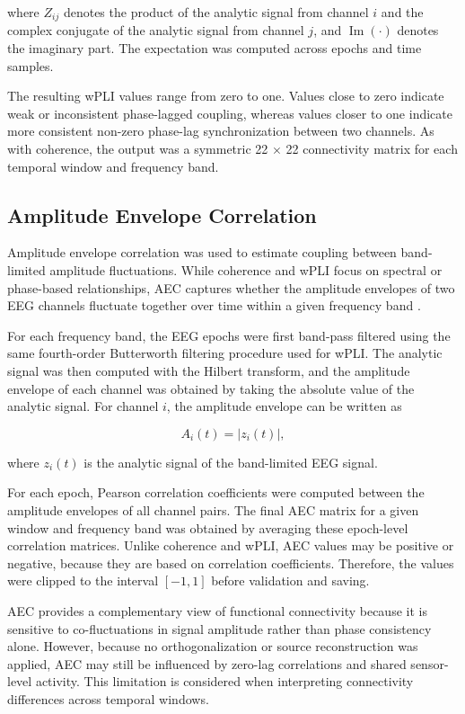 where $Z_{ij}$ denotes the product of the analytic signal from channel $i$ and
the complex conjugate of the analytic signal from channel $j$, and
$\operatorname{Im}(\cdot)$ denotes the imaginary part. The expectation was
computed across epochs and time samples.

The resulting wPLI values range from zero to one. Values close to zero indicate
weak or inconsistent phase-lagged coupling, whereas values closer to one
indicate more consistent non-zero phase-lag synchronization between two
channels. As with coherence, the output was a symmetric \num{22} $\times$
\num{22} connectivity matrix for each temporal window and frequency band.

\subsection{Amplitude Envelope Correlation}
\label{subsec:aec}

Amplitude envelope correlation was used to estimate coupling between
band-limited amplitude fluctuations. While coherence and wPLI focus on spectral
or phase-based relationships, AEC captures whether the amplitude envelopes of
two EEG channels fluctuate together over time within a given frequency band \cite{Bruns2000,Hipp2012}.

For each frequency band, the EEG epochs were first band-pass filtered using the
same fourth-order Butterworth filtering procedure used for wPLI. The analytic
signal was then computed with the Hilbert transform, and the amplitude envelope
of each channel was obtained by taking the absolute value of the analytic
signal. For channel $i$, the amplitude envelope can be written as

\[
    A_i(t) = |z_i(t)|,
\]

where $z_i(t)$ is the analytic signal of the band-limited EEG signal.

For each epoch, Pearson correlation coefficients were computed between the
amplitude envelopes of all channel pairs. The final AEC matrix for a given
window and frequency band was obtained by averaging these epoch-level
correlation matrices. Unlike coherence and wPLI, AEC values may be positive or
negative, because they are based on correlation coefficients. Therefore, the
values were clipped to the interval $[-1,1]$ before validation and saving.

AEC provides a complementary view of functional connectivity because it is
sensitive to co-fluctuations in signal amplitude rather than phase consistency
alone. However, because no orthogonalization or source reconstruction was
applied, AEC may still be influenced by zero-lag correlations and shared
sensor-level activity. This limitation is considered when interpreting
connectivity differences across temporal windows.

